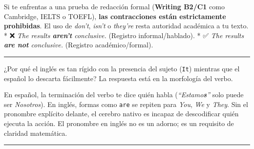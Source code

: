 \documentclass[
  spanish,
  letterpaper,
]{scrbook}
\begin{document}
\begin{tcolorbox}[enhanced jigsaw, opacityback=0, toptitle=1mm, toprule=.15mm, leftrule=.75mm, colframe=quarto-callout-important-color-frame, coltitle=black, opacitybacktitle=0.6, rightrule=.15mm, titlerule=0mm, bottomtitle=1mm, arc=.35mm, left=2mm, colback=white, breakable, bottomrule=.15mm, title={🔥 Tip directo para el examen}, colbacktitle=quarto-callout-important-color!10!white]

Si te enfrentas a una prueba de redacción formal (\textbf{Writing B2/C1}
como Cambridge, IELTS o TOEFL), \textbf{las contracciones están
estrictamente prohibidas}. El uso de \emph{don't}, \emph{isn't} o
\emph{they're} resta autoridad académica a tu texto. * ❌ \emph{The
results \textbf{aren't} conclusive.} (Registro informal/hablado). * ✅
\emph{The results \textbf{are not} conclusive.} (Registro
académico/formal).

\end{tcolorbox}

\begin{center}\rule{0.5\linewidth}{0.5pt}\end{center}

\begin{tcolorbox}[enhanced jigsaw, opacityback=0, toptitle=1mm, toprule=.15mm, leftrule=.75mm, colframe=quarto-callout-caution-color-frame, coltitle=black, opacitybacktitle=0.6, rightrule=.15mm, titlerule=0mm, bottomtitle=1mm, arc=.35mm, left=2mm, colback=white, breakable, bottomrule=.15mm, title={🧠 Momento de reflexión profunda}, colbacktitle=quarto-callout-caution-color!10!white]

¿Por qué el inglés es tan rígido con la presencia del sujeto
(\texttt{It}) mientras que el español lo descarta fácilmente? La
respuesta está en la morfología del verbo.

En español, la terminación del verbo te dice quién habla
(\emph{``Estamo\textbf{s}''} solo puede ser \emph{Nosotros}). En inglés,
formas como \texttt{are} se repiten para \emph{You}, \emph{We} y
\emph{They}. Sin el pronombre explícito delante, el cerebro nativo es
incapaz de descodificar quién ejecuta la acción. El pronombre en inglés
no es un adorno; es un requisito de claridad matemática.

\end{tcolorbox}

\begin{center}\rule{0.5\linewidth}{0.5pt}\end{center}
\end{document}
